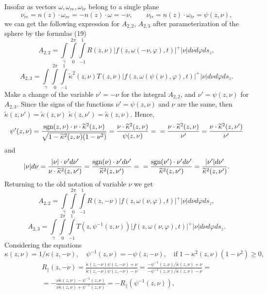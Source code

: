 \documentclass[12pt,reqno]{report}
\def\sgn{\mathrm{sgn}}
\begin{document}
Insofar as vectors $\omega,\omega_{re},\omega_{tr}$ belong to a single plane
$$
\nu_{re}=n(z) \cdot \omega_{re} = - n(z) \cdot \omega
=-\nu,\qquad \nu_{tr}=n(z)\cdot\omega_{tr}=\psi(z,\nu),
$$
we can get the following expression for $A_{2,2}$,  $A_{2,3}$ after parameterization of the sphere by the formulas (19)
$$
 A_{2,2}= \int \limits_{\gamma} \int
\limits^{2\pi}_{0} \int \limits^{1}_{-1} R(z,\nu)
|f(z,\omega(-\nu,\varphi),t)|^+ |\nu| d \nu d \varphi  d s_z,
$$
$$
 A_{2,3} = \int \limits_{\gamma}
 \int
\limits^{2\pi}_{0} \int \limits^{1}_{-1} \widetilde{\kappa}^2(z,\nu )
T(z,\nu) |f(z,\omega(\psi(\nu),\varphi),t)|^+ |\nu| d \nu d
\varphi  d s_z.
$$
Make a change of the variable $\nu'=-\nu$ for the integral $A_{2,2}$, and $\nu'=\psi(z,\nu)$ for $A_{2,3}$.
Since the signs of the functions $\nu'=\psi(z,\nu)$ and $\nu$ are the same, then $\widetilde{\kappa}(z,\nu')=\widetilde{\kappa}(z,\nu)$
$\widetilde{\kappa}(z,\nu')=\widetilde{\kappa}(z,\nu)$. 
Hence,
$$
\psi'(z,\nu)=\dfrac{{\sgn}(z,\nu) \cdot \nu\cdot
	\widetilde{\kappa}^2(z,\nu)}{\sqrt{1-\widetilde{\kappa}^2(z,\nu)(1-\nu^2)}}
= \dfrac{ \nu \cdot\widetilde{\kappa}^2(z,\nu)}{\psi(z,\nu)} = \\=  \dfrac{
	\nu \cdot\widetilde{\kappa}^2(z,\nu)}{\nu'}= \dfrac{ \nu
	\cdot\widetilde{\kappa}^2(z,\nu')}{\nu'}
$$
and
$$
|\nu|d\nu= \frac{|\nu| \cdot \nu'
	d\nu'}{\nu\cdot\widetilde{\kappa}^2(z,\nu')} = \frac{{\sgn}(\nu)
	\cdot \nu' d\nu'}{\widetilde{\kappa}^2(z,\nu')}= \\= \frac{{\sgn}(\nu')
	\cdot \nu' d\nu'}{\widetilde{\kappa}^2(z,\nu')}= \frac{|\nu'|
	d\nu'}{\widetilde{\kappa}^2(z,\nu')} .
$$
Returning to the old notation of variable $\nu$ we get
$$
A_{2,2}= \int \limits_{\gamma} \int
\limits^{2\pi}_{0} \int \limits^{1}_{-1} R(z,-\nu)
|f(z,\omega(\nu,\varphi),t)|^+ |\nu| d \nu d \varphi  d s_z,
$$
$$
A_{2,3} = \int \limits_{\gamma}
\int
\limits^{2\pi}_{0} \int \limits^{1}_{-1} 
T(z,\psi^{-1}(z,\nu)) |f(z,\omega(\nu,\varphi),t)|^+ |\nu| d \nu d
\varphi  d s_z.
$$
Considering the equations
$$
\kappa(z,\nu)=1/\kappa(z,-\nu), \quad \psi^{-1}(z,\nu)=-\psi(z,-\nu),
\quad \text{if} \; 1-\kappa^2(z,\nu)(1-\nu^2) \geq 0,
$$
\begin{multline}
R_{\|}(z,-\nu)=\frac{\widetilde{\kappa}(z,-\nu)
	\psi(z,-\nu)+\nu}{\widetilde{\kappa}(z,-\nu) \psi(z,-\nu)-\nu}= \frac{
	-\psi^{-1}(z,\nu)/\widetilde{\kappa}(z,\nu)+\nu}{-\psi^{-1}(z,\nu)/\widetilde{\kappa}(z,\nu)
	-\nu}= \\ =-\frac{\nu \widetilde{\kappa}(z,\nu) - \psi^{-1}(z,\nu)}
{\nu\widetilde{\kappa}(z,\nu) + \psi^{-1}(z,\nu)}=
-R_{\|}(\psi^{-1}(z,\nu)), \nonumber
\end{multline}
\end{document}
